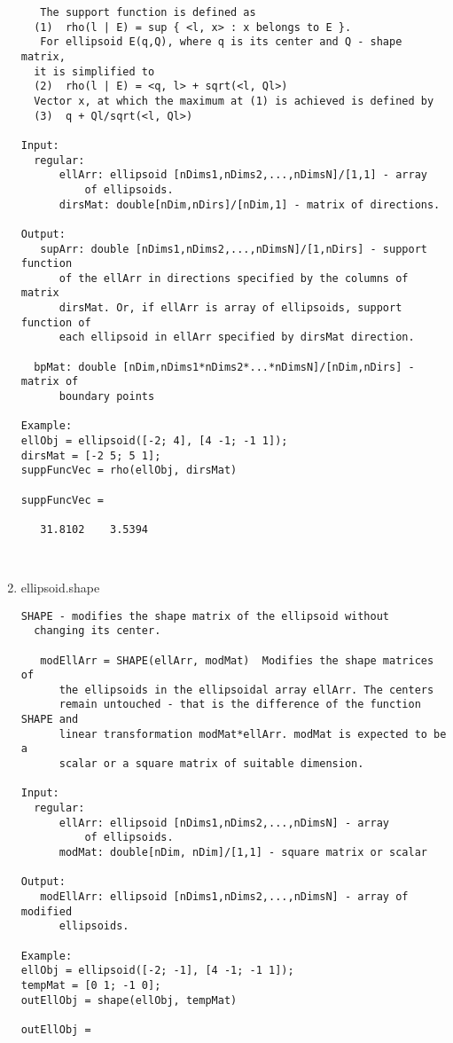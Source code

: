 \begin{enumerate}
\begin{lstlisting}
   The support function is defined as
  (1)  rho(l | E) = sup { <l, x> : x belongs to E }.
   For ellipsoid E(q,Q), where q is its center and Q - shape matrix,
  it is simplified to
  (2)  rho(l | E) = <q, l> + sqrt(<l, Ql>)
  Vector x, at which the maximum at (1) is achieved is defined by
  (3)  q + Ql/sqrt(<l, Ql>)

Input:
  regular:
      ellArr: ellipsoid [nDims1,nDims2,...,nDimsN]/[1,1] - array
          of ellipsoids.
      dirsMat: double[nDim,nDirs]/[nDim,1] - matrix of directions.

Output:
   supArr: double [nDims1,nDims2,...,nDimsN]/[1,nDirs] - support function
      of the ellArr in directions specified by the columns of matrix
      dirsMat. Or, if ellArr is array of ellipsoids, support function of
      each ellipsoid in ellArr specified by dirsMat direction.

  bpMat: double [nDim,nDims1*nDims2*...*nDimsN]/[nDim,nDirs] - matrix of
      boundary points

Example:
ellObj = ellipsoid([-2; 4], [4 -1; -1 1]);
dirsMat = [-2 5; 5 1];
suppFuncVec = rho(ellObj, dirsMat)

suppFuncVec =

   31.8102    3.5394



\end{lstlisting}
\fontfamily{\familydefault}
\selectfont
\item {ellipsoid.shape}
\selectfont
\begin{lstlisting}
SHAPE - modifies the shape matrix of the ellipsoid without
  changing its center.

   modEllArr = SHAPE(ellArr, modMat)  Modifies the shape matrices of
      the ellipsoids in the ellipsoidal array ellArr. The centers
      remain untouched - that is the difference of the function SHAPE and
      linear transformation modMat*ellArr. modMat is expected to be a
      scalar or a square matrix of suitable dimension.

Input:
  regular:
      ellArr: ellipsoid [nDims1,nDims2,...,nDimsN] - array
          of ellipsoids.
      modMat: double[nDim, nDim]/[1,1] - square matrix or scalar

Output:
   modEllArr: ellipsoid [nDims1,nDims2,...,nDimsN] - array of modified
      ellipsoids.

Example:
ellObj = ellipsoid([-2; -1], [4 -1; -1 1]);
tempMat = [0 1; -1 0];
outEllObj = shape(ellObj, tempMat)

outEllObj =


\end{lstlisting}
\end{enumerate}

